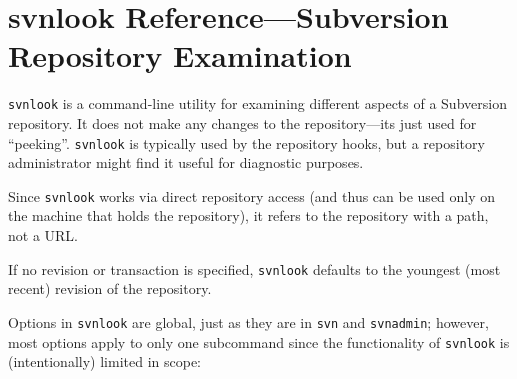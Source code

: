 \chapter{svnlook Reference---Subversion Repository
Examination}\label{svn.ref.svnlook}

\texttt{svnlook} is a command-line utility for examining different
aspects of a Subversion repository. It does not make any changes to the
repository---it\textquotesingle s just used for ``peeking''.
\texttt{svnlook} is typically used by the repository hooks, but a
repository administrator might find it useful for diagnostic purposes.

Since \texttt{svnlook} works via direct repository access (and thus can
be used only on the machine that holds the repository), it refers to the
repository with a path, not a URL.

If no revision or transaction is specified, \texttt{svnlook} defaults to
the youngest (most recent) revision of the repository.

Options in \texttt{svnlook} are global, just as they are in \texttt{svn}
and \texttt{svnadmin}; however, most options apply to only one
subcommand since the functionality of \texttt{svnlook} is
(intentionally) limited in scope:

\protect{}\label{svn.ref.svnlook.sw}{}

